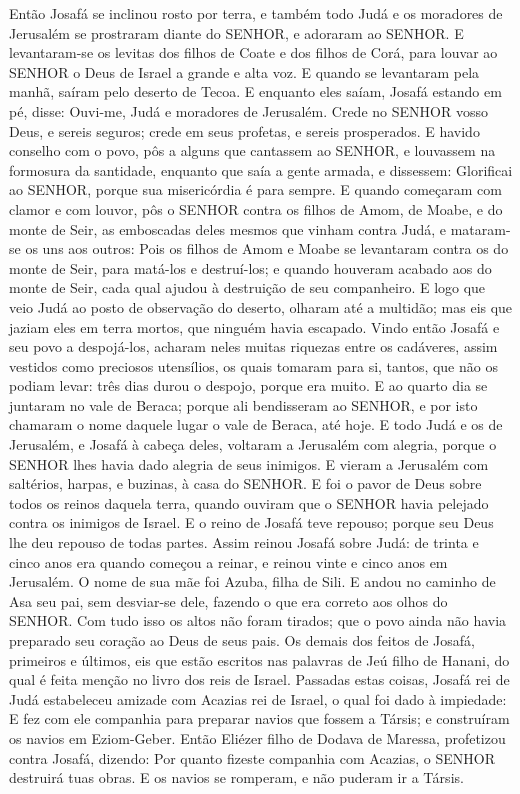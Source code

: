 {Então Josafá se inclinou rosto por terra, e também todo Judá e os moradores de Jerusalém se prostraram diante do SENHOR, e adoraram ao SENHOR.
E levantaram-se os levitas dos filhos de Coate e dos filhos de Corá, para louvar ao SENHOR o Deus de Israel a grande e alta voz.
E quando se levantaram pela manhã, saíram pelo deserto de Tecoa. E enquanto eles saíam, Josafá estando em pé, disse: Ouvi-me, Judá e moradores de Jerusalém. Crede no SENHOR vosso Deus, e sereis seguros; crede em seus profetas, e sereis prosperados.
E havido conselho com o povo, pôs a alguns que cantassem ao SENHOR, e louvassem na formosura da santidade, enquanto que saía a gente armada, e dissessem: Glorificai ao SENHOR, porque sua misericórdia é para sempre.
E quando começaram com clamor e com louvor, pôs o SENHOR contra os filhos de Amom, de Moabe, e do monte de Seir, as emboscadas deles mesmos que vinham contra Judá, e mataram-se os uns aos outros:
Pois os filhos de Amom e Moabe se levantaram contra os do monte de Seir, para matá-los e destruí-los; e quando houveram acabado aos do monte de Seir, cada qual ajudou à destruição de seu companheiro.
E logo que veio Judá ao posto de observação do deserto, olharam até a multidão; mas eis que jaziam eles em terra mortos, que ninguém havia escapado.
Vindo então Josafá e seu povo a despojá-los, acharam neles muitas riquezas entre os cadáveres, assim vestidos como preciosos utensílios, os quais tomaram para si, tantos, que não os podiam levar: três dias durou o despojo, porque era muito.
E ao quarto dia se juntaram no vale de Beraca; porque ali bendisseram ao SENHOR, e por isto chamaram o nome daquele lugar o vale de Beraca, até hoje.
E todo Judá e os de Jerusalém, e Josafá à cabeça deles, voltaram a Jerusalém com alegria, porque o SENHOR lhes havia dado alegria de seus inimigos.
E vieram a Jerusalém com saltérios, harpas, e buzinas, à casa do SENHOR.
E foi o pavor de Deus sobre todos os reinos daquela terra, quando ouviram que o SENHOR havia pelejado contra os inimigos de Israel.
E o reino de Josafá teve repouso; porque seu Deus lhe deu repouso de todas partes.
Assim reinou Josafá sobre Judá: de trinta e cinco anos era quando começou a reinar, e reinou vinte e cinco anos em Jerusalém. O nome de sua mãe foi Azuba, filha de Sili.
E andou no caminho de Asa seu pai, sem desviar-se dele, fazendo o que era correto aos olhos do SENHOR.
Com tudo isso os altos não foram tirados; que o povo ainda não havia preparado seu coração ao Deus de seus pais.
Os demais dos feitos de Josafá, primeiros e últimos, eis que estão escritos nas palavras de Jeú filho de Hanani, do qual é feita menção no livro dos reis de Israel.
Passadas estas coisas, Josafá rei de Judá estabeleceu amizade com Acazias rei de Israel, o qual foi dado à impiedade:
E fez com ele companhia para preparar navios que fossem a Társis; e construíram os navios em Eziom-Geber.
Então Eliézer filho de Dodava de Maressa, profetizou contra Josafá, dizendo: Por quanto fizeste companhia com Acazias, o SENHOR destruirá tuas obras. E os navios se romperam, e não puderam ir a Társis.

}

